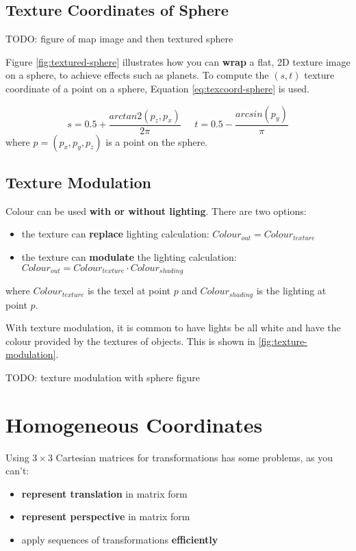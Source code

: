 \documentclass{article}
\begin{document}
\subsection{Texture Coordinates of Sphere}

TODO: figure of map image and then textured sphere

Figure \ref{fig:textured-sphere} illustrates how you can \textbf{wrap} a flat, 2D texture image on a sphere, to achieve effects such as planets. To compute the $(s, t)$ texture coordinate of a point on a sphere, Equation \ref{eq:texcoord-sphere} is used.

\begin{equation}
	s = 0.5 + \frac{arctan2(p_z, p_x)}{2 \pi} \;\;\;\;\;
	t = 0.5 - \frac{arcsin(p_y)}{\pi}
	\label{eq:texcoord-sphere}
\end{equation}
where $p = (p_x, p_y, p_z)$ is a point on the sphere.

\subsection{Texture Modulation}

Colour can be used \textbf{with or without lighting}. There are two options:
\begin{itemize}
	\item the texture can \textbf{replace} lighting calculation: $Colour_{out} = Colour_{texture}$
	\item the texture can \textbf{modulate} the lighting calculation: $Colour_{out} = Colour_{texture} \cdot Colour_{shading}$
\end{itemize} 
where $Colour_{texture}$ is the texel at point $p$ and $Colour_{shading}$ is the lighting at point $p$. 

With texture modulation, it is common to have lights be all white and have the colour provided by the textures of objects. This is shown in \ref{fig:texture-modulation}.

TODO: texture modulation with sphere figure

\section{Homogeneous Coordinates}

Using $3 \times 3$ Cartesian matrices for transformations has some problems, as you can't:
\begin{itemize}
	\item \textbf{represent translation} in matrix form
	\item \textbf{represent perspective} in matrix form	
	\item apply sequences of transformations \textbf{efficiently}
\end{itemize}
\end{document}

